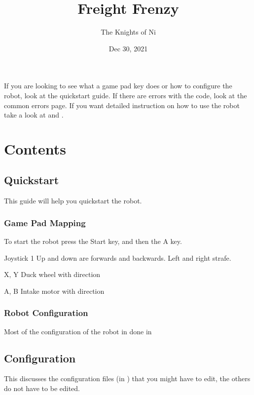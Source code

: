 \documentclass[letterpaper,10pt,english]{sphinxmanual}
\title{Freight Frenzy}
\date{Dec 30, 2021}
\author{The Knights of Ni}
\begin{document}
\pagestyle{empty}
\sphinxmaketitle
\pagestyle{plain}
\sphinxtableofcontents
\pagestyle{normal}
\label{\detokenize{index::doc}}


\sphinxAtStartPar
If you are looking to see what a game pad key does or how to configure the robot, look at the quickstart guide.
If there are errors with the code, look at the common errors page. If you want detailed instruction on how to use the
robot take a look at {\hyperref[\detokenize{configuration::doc}]{}} and {\hyperref[\detokenize{game_pad::doc}]{}}.


\chapter{Contents}
\label{\detokenize{index:contents}}

\section{Quickstart}
\label{\detokenize{quickstart:quickstart}}\label{\detokenize{quickstart::doc}}
\sphinxAtStartPar
This guide will help you quickstart the robot.


\subsection{Game Pad Mapping}
\label{\detokenize{quickstart:game-pad-mapping}}
\sphinxAtStartPar
To start the robot press the Start key, and then the A key.

\sphinxAtStartPar
Joystick 1 \sphinxhyphen{} Up and down are forwards and backwards. Left and right strafe.

\sphinxAtStartPar
X, Y \sphinxhyphen{} Duck wheel with direction

\sphinxAtStartPar
A, B \sphinxhyphen{} Intake motor with direction


\subsection{Robot Configuration}
\label{\detokenize{quickstart:robot-configuration}}
\sphinxAtStartPar
Most of the configuration of the robot in done in 


\section{Configuration}
\label{\detokenize{configuration:configuration}}\label{\detokenize{configuration::doc}}
\sphinxAtStartPar
This discusses the configuration files (in ) that you might have to edit, the others do not have to be edited.
\end{document}
